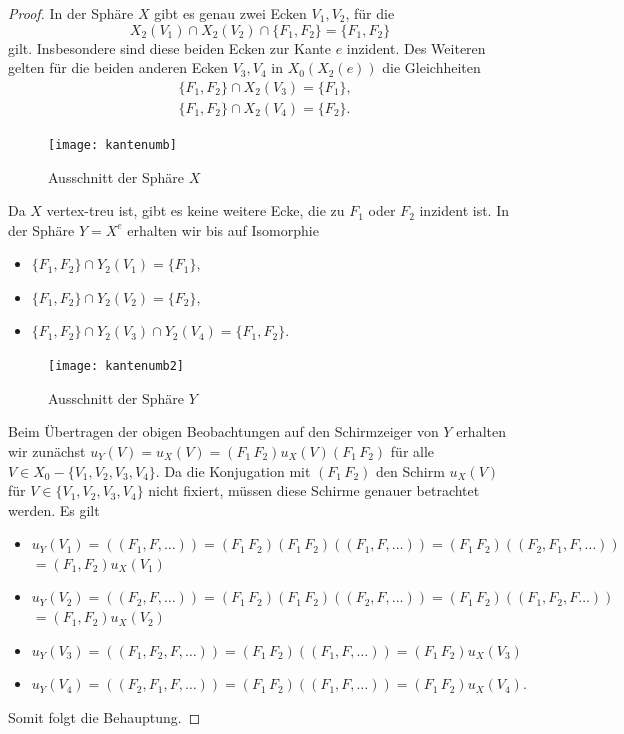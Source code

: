 \documentclass[12pt,titlepage,twoside,cleardoublepage]{article}
\theoremstyle{nummermitklammern}
\numberwithin{equation}{section}
\begin{document}
\begin{proof}
In der Sphäre $X$ gibt es genau zwei Ecken $V_1,V_2$, für die 
\[
X_2(V_1)\cap X_2(V_2)\cap \{F_1,F_2\}=\{F_1,F_2\}
\] 
gilt. Insbesondere sind diese beiden Ecken zur Kante $e$  inzident. Des Weiteren gelten für die beiden anderen Ecken $V_3,V_4$ in $X_0(X_2(e))$ die Gleichheiten 
\begin{align*}
&\{F_1,F_2\} \cap X_2(V_3)=\{F_1\},\\
&\{F_1,F_2\} \cap X_2(V_4)=\{F_2\}.
\end{align*}  
\begin{figure}[H]
\begin{center}
\texttt{[image: kantenumb]}
\end{center}
\caption{Ausschnitt der Sphäre $X$}
\end{figure}
Da $X$ vertex-treu ist, gibt es keine weitere Ecke, die zu $F_1$ oder $F_2$ inzident ist.
In der Sphäre $Y=X^e$ erhalten wir bis auf Isomorphie  
\begin{itemize}
\item $\{F_1,F_2\} \cap Y_2(V_1)=\{F_1\},$ 
\item $\{F_1,F_2\} \cap Y_2(V_2)=\{F_2\},$
\item $\{F_1,F_2\} \cap Y_2(V_3)\cap Y_2(V_4)=\{F_1,F_2\}$.
\end{itemize}
\begin{figure}[H]
\begin{center}
\texttt{[image: kantenumb2]}
\end{center}
\caption{Ausschnitt der Sphäre $Y$}
\end{figure}
Beim Übertragen der obigen Beobachtungen auf den Schirmzeiger von $Y$ erhalten wir zunächst $u_Y(V)=u_X(V)=(F_1\,F_2)u_X(V) (F_1\,F_2)$
für alle $V\in X_0-\{V_1,V_2,V_3,V_4\}.$
Da die Konjugation mit $(F_1\,F_2)$ den Schirm $u_X(V)$ für $V\in \{V_1,V_2,V_3,V_4\}$ nicht fixiert, müssen diese Schirme genauer betrachtet werden. 
Es gilt
\begin{itemize} 
\item $u_{Y}(V_1)=((F_1,F,\ldots))=(F_1\,F_2)(F_1\,F_2)((F_1,F,\ldots))=(F_1\,F_2)((F_2,F_1,F,\ldots))$ \\$=(F_1,F_2)u_X(V_1)$
\item $u_{Y}(V_2)=((F_2,F,\ldots))=(F_1\,F_2)(F_1\,F_2)((F_2,F,\ldots))=(F_1\,F_2)((F_1,F_2,F\ldots))$\\$=(F_1,F_2)u_X(V_2)$
\item $u_{Y}(V_3)=((F_1,F_2,F,\ldots))=(F_1\,F_2)((F_1,F,\ldots))=(F_1\,F_2)u_X(V_3)$
\item $u_{Y}(V_4)=((F_2,F_1,F,\ldots))=(F_1\,F_2)((F_1,F,\ldots))=(F_1\,F_2)u_X(V_4).$
\end{itemize}
Somit folgt die Behauptung.
\end{proof}
\end{document}
